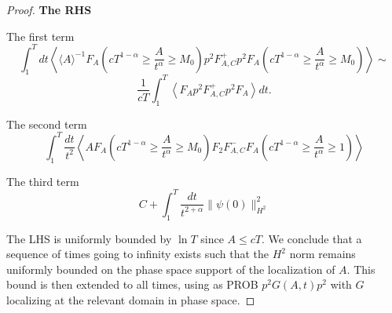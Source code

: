 \documentclass[10pt,a4paper]{amsart}
\begin{document}
\begin{proof}
{\bf The RHS}

The first term
$$
 \int_{1}^{T} d t\left\langle \langle A\rangle^{-1} F_{A}\left(cT^{1-\alpha}\geq \frac{A}{t^{\alpha}} \geqslant M_{0}\right) p^{2} F_{A,C}^{+} p^{2} F_{A}\left(cT^{1-\alpha}\geq\frac{A}{t^{\alpha}} \geqslant M_{0}\right)\right\rangle\sim
 $$
$$
\frac{1}{cT}\int_1^T \left \langle F_A p^2 F^+_{A,C} p^2 F_A\right \rangle d t.
$$


The second term
$$
\int_{1}^{T} \frac{d t}{t^{2}}\left\langle A F_{A}\left(cT^{1-\alpha}\geq\frac{A}{t^{\alpha}} \geqslant M_{0}\right) F_2 F_{A ,C}^{-} F_{A}\left(cT^{1-\alpha}\geq \frac{A}{t^{\alpha}} \geqslant 1\right)\right\rangle
$$

The third term
$$
C+\int_{1}^{T} \frac{d t}{t^{2+\alpha}}\|\psi(0)\|_{H^{2}}^{2}
$$

The LHS is uniformly bounded by $\ln T$ since $A\leq cT.$
We conclude that a sequence of times going to infinity exists such that the $H^2$ norm remains uniformly bounded on the phase space support of the localization of $A.$ This bound is then extended to all times, using as PROB $p^2G(A,t)p^2$ with $G$ localizing at the relevant domain in phase space. \end{proof}
\end{document}
